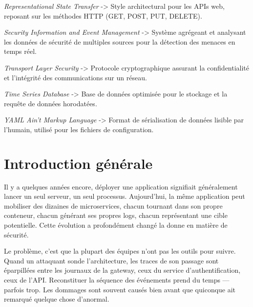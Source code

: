 \documentclass[12pt, a4paper]{report}
\begin{document}
\begin{description}[leftmargin=3.5cm, style=nextline]
  \item[REST] \textit{Representational State Transfer} -> Style architectural pour les APIs web, reposant sur les méthodes HTTP (GET, POST, PUT, DELETE).

  \item[SIEM] \textit{Security Information and Event Management} -> Système agrégeant et analysant les données de sécurité de multiples sources pour la détection des menaces en temps réel.

  \item[TLS] \textit{Transport Layer Security} -> Protocole cryptographique assurant la confidentialité et l'intégrité des communications sur un réseau.

  \item[TSDB] \textit{Time Series Database} -> Base de données optimisée pour le stockage et la requête de données horodatées.

  \item[YAML] \textit{YAML Ain't Markup Language} -> Format de sérialisation de données lisible par l'humain, utilisé pour les fichiers de configuration.

\end{description}

\clearpage

\chapter*{Introduction générale}

Il y a quelques années encore, déployer une application signifiait généralement lancer un seul serveur, un seul processus. Aujourd'hui, la même application peut mobiliser des dizaines de microservices, chacun tournant dans son propre conteneur, chacun générant ses propres logs, chacun représentant une cible potentielle. Cette évolution a profondément changé la donne en matière de sécurité.

Le problème, c'est que la plupart des équipes n'ont pas les outils pour suivre. Quand un attaquant sonde l'architecture, les traces de son passage sont éparpillées entre les journaux de la gateway, ceux du service d'authentification, ceux de l'API. Reconstituer la séquence des événements prend du temps — parfois trop. Les dommages sont souvent causés bien avant que quiconque ait remarqué quelque chose d'anormal.
\end{document}
